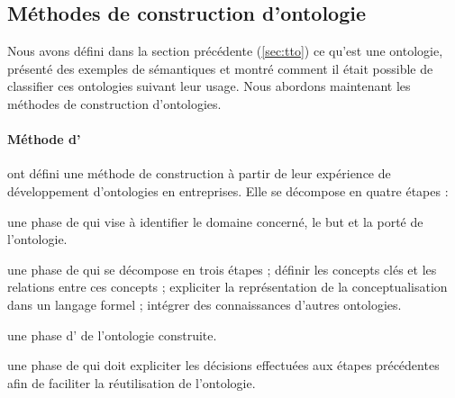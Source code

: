 \subsection{Méthodes de construction d'ontologie}\label{sec:construction}
Nous avons défini dans la section précédente (\ref{sec:tto}) ce qu'est une ontologie, présenté des exemples de sémantiques et montré comment il était possible de classifier ces ontologies suivant leur usage. 
Nous abordons maintenant les méthodes de construction d'ontologies.


\paragraph{Méthode d'\cite{Uschold1996}}
\citeauthor{Uschold1996} ont défini une méthode de construction à partir de leur expérience de développement d'ontologies en entreprises. 
Elle se décompose en quatre étapes :
\begin{listenum}
	\item une phase de  qui vise à identifier le domaine concerné, le but et la porté de l'ontologie.
	\item une phase de  qui se décompose en trois étapes ; définir les concepts clés et les relations entre ces concepts ; expliciter la représentation de la conceptualisation dans un langage formel ; intégrer des connaissances d'autres ontologies.
	\item une phase d' de l'ontologie construite.
	\item une phase de  qui doit expliciter les décisions effectuées aux étapes précédentes afin de faciliter la réutilisation de l'ontologie.
\end{listenum}


